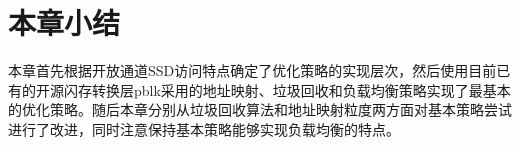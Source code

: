 




\section{本章小结}
本章首先根据开放通道SSD访问特点确定了优化策略的实现层次，然后使用目前已有的开源闪存转换层pblk采用的地址映射、垃圾回收和负载均衡策略实现了最基本的优化策略。随后本章分别从垃圾回收算法和地址映射粒度两方面对基本策略尝试进行了改进，同时注意保持基本策略能够实现负载均衡的特点。
